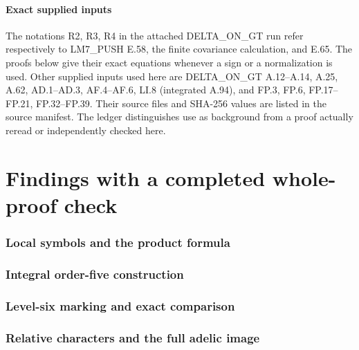 \documentclass[11pt]{article}
\begin{document}
\subsection{Exact supplied inputs}
The notations R2, R3, R4 in the attached DELTA\_ON\_GT run
refer respectively to LM7\_PUSH E.58, the finite covariance
calculation, and E.65.  The proofs below give their exact
equations whenever a sign or a normalization is used.
Other supplied inputs used here are DELTA\_ON\_GT A.12--A.14,
A.25, A.62, AD.1--AD.3, AF.4--AF.6, LI.8 (integrated A.94),
and FP.3, FP.6, FP.17--FP.21, FP.32--FP.39.  Their source
files and SHA-256 values are listed in the source manifest.
The ledger distinguishes use as background from a proof
actually reread or independently checked here.

\part{Findings with a completed whole-proof check}
\section{Local symbols and the product formula}





\section{Integral order-five construction}





\section{Level-six marking and exact comparison}



\section{Relative characters and the full adelic image}


\end{document}

